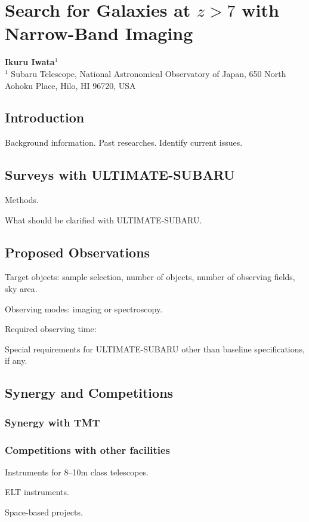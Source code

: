 \section{Search for Galaxies at $z>7$ with Narrow-Band Imaging
\label{sec:nbf}}

\noindent
\begin{center}
{\bf Ikuru Iwata$^{1}$}\\
$^1$ Subaru Telescope, National Astronomical Observatory of Japan, 650
North Aohoku Place, Hilo, HI 96720, USA
\end{center}
\vspace{0.5cm}

\subsection{Introduction}

Background information. 
Past researches.
Identify current issues.

\subsection{Surveys with ULTIMATE-SUBARU}

Methods.

What should be clarified with ULTIMATE-SUBARU.

\subsection{Proposed Observations}

Target objects: sample selection, number of objects, number of observing
fields, sky area.

Observing modes: imaging or spectroscopy.

Required observing time:

Special requirements for ULTIMATE-SUBARU other than baseline
specifications, if any.

\subsection{Synergy and Competitions}

\subsubsection{Synergy with TMT}

\subsubsection{Competitions with other facilities}

Instruments for 8--10m class telescopes.

ELT instruments.

Space-based projects.
